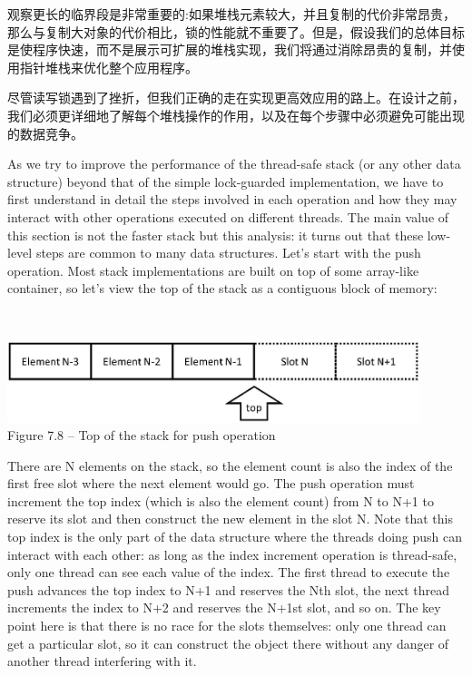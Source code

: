 观察更长的临界段是非常重要的:如果堆栈元素较大，并且复制的代价非常昂贵，那么与复制大对象的代价相比，锁的性能就不重要了。但是，假设我们的总体目标是使程序快速，而不是展示可扩展的堆栈实现，我们将通过消除昂贵的复制，并使用指针堆栈来优化整个应用程序。

尽管读写锁遇到了挫折，但我们正确的走在实现更高效应用的路上。在设计之前，我们必须更详细地了解每个堆栈操作的作用，以及在每个步骤中必须避免可能出现的数据竞争。


As we try to improve the performance of the thread-safe stack (or any other data structure) beyond that of the simple lock-guarded implementation, we have to first understand in detail the steps involved in each operation and how they may interact with other operations executed on different threads. The main value of this section is not the faster stack but this analysis: it turns out that these low-level steps are common to many data structures. Let's start with the push operation. Most stack implementations are built on top of some array-like container, so let's view the top of the stack as a contiguous block of memory:

\hspace*{\fill} \\ %
\begin{center}
\includegraphics[width=0.9\textwidth]{content/2/chapter7/images/8.jpg}\\
Figure 7.8 – Top of the stack for push operation
\end{center}

There are N elements on the stack, so the element count is also the index of the first free slot where the next element would go. The push operation must increment the top index (which is also the element count) from N to N+1 to reserve its slot and then construct the new element in the slot N. Note that this top index is the only part of the data structure where the threads doing push can interact with each other: as long as the index increment operation is thread-safe, only one thread can see each value of the index. The first thread to execute the push advances the top index to N+1 and reserves the Nth slot, the next thread increments the index to N+2 and reserves the N+1st slot, and so on. The key point here is that there is no race for the slots themselves: only one thread can get a particular slot, so it can construct the object there without any danger of another thread interfering with it.

